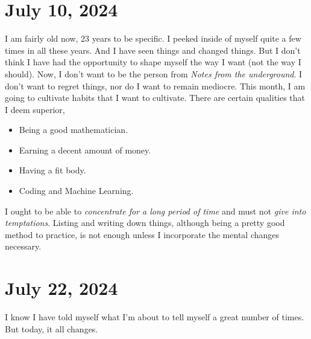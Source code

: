 \section{July 10, 2024}
\noindent I am fairly old now, 23 years to be specific. I peeked inside of myself quite a few times in all
these years. And I have seen things and changed things. But I don't think I have had the opportunity to
shape myself the way I want (not the way I should). Now, I don't want to be the person from \emph{Notes
from the underground}. I don't want to regret things, nor do I want to remain mediocre. This month, I am
going to cultivate habits that I want to cultivate. There are certain qualities that I deem superior,

\begin{itemize}
\itemsep0em
	\item Being a good mathematician.
	\item Earning a decent amount of money.
	\item Having a fit body.
	\item Coding and Machine Learning.
\end{itemize}

\noindent I ought to be able to \emph{concentrate for a long period of time} and must not \emph{give into
temptations}. Listing and writing down things, although being a pretty good method to practice, is not 
enough unless I incorporate the mental changes necessary.

\section{July 22, 2024}
\noindent I know I have told myself what I'm about to tell myself a great number of times. But today, it all
changes.


